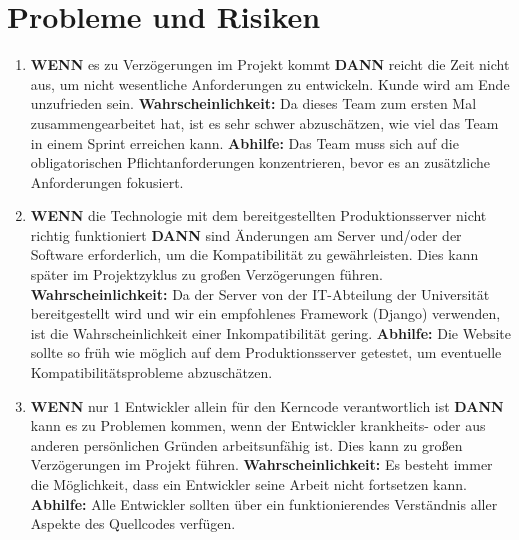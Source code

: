 \section{Probleme und Risiken}
\begin{enumerate}
	\item
    \textbf{WENN} es zu Verzögerungen im Projekt kommt \textbf{DANN} reicht die Zeit nicht aus, um nicht wesentliche Anforderungen zu entwickeln. Kunde wird am Ende unzufrieden sein.
    \linebreak
    \linebreak
    \textbf{Wahrscheinlichkeit:}  Da dieses Team zum ersten Mal zusammengearbeitet hat, ist es sehr schwer abzuschätzen, wie viel das Team in einem Sprint erreichen kann.
    \linebreak
    \linebreak
    \textbf{Abhilfe:} Das Team muss sich auf die obligatorischen Pflichtanforderungen konzentrieren, bevor es an zusätzliche Anforderungen fokusiert.
    \linebreak

    \item
    \textbf{WENN} die Technologie mit dem bereitgestellten Produktionsserver nicht richtig funktioniert \textbf{DANN} sind Änderungen am Server und/oder der Software erforderlich, um die Kompatibilität zu gewährleisten. Dies kann später im Projektzyklus zu großen Verzögerungen führen.
    \linebreak
    \linebreak
    \textbf{Wahrscheinlichkeit:} Da der Server von der IT-Abteilung der Universität bereitgestellt wird und wir ein empfohlenes Framework (Django) verwenden, ist die Wahrscheinlichkeit einer Inkompatibilität gering.
    \linebreak
    \linebreak
    \textbf{Abhilfe:} Die Website sollte so früh wie möglich auf dem Produktionsserver getestet, um eventuelle Kompatibilitätsprobleme abzuschätzen.
    \linebreak
    
    \item
    \textbf{WENN} nur 1 Entwickler allein für den Kerncode verantwortlich ist \textbf{DANN} kann es zu Problemen kommen, wenn der Entwickler krankheits- oder aus anderen persönlichen Gründen arbeitsunfähig ist. Dies kann zu großen Verzögerungen im Projekt führen.
    \linebreak
    \linebreak
    \textbf{Wahrscheinlichkeit:} Es besteht immer die Möglichkeit, dass ein Entwickler seine Arbeit nicht fortsetzen kann.
    \linebreak
    \linebreak
    \textbf{Abhilfe:} Alle Entwickler sollten über ein funktionierendes Verständnis aller Aspekte des Quellcodes verfügen.
    \linebreak


\end{enumerate}

